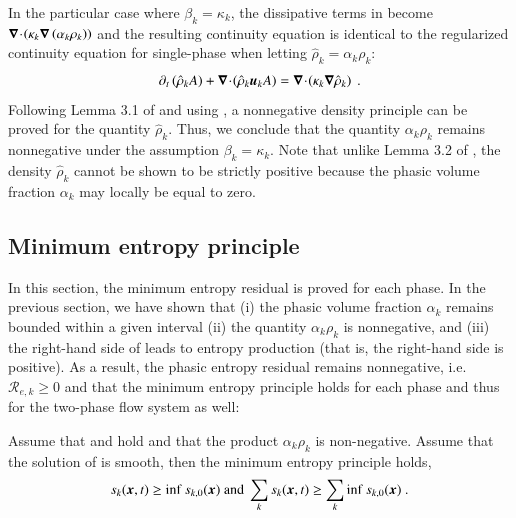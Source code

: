 %
In the particular case where $\beta_k = \kappa_k$, the dissipative terms in  become $\boldsymbol\nabla\! \cdot \! \left( \kappa_k \boldsymbol\nabla \left( \alpha_k \rho_k \right) \right)$ 
and the resulting continuity equation is identical to the regularized continuity equation for single-phase when letting $\hat{\rho}_k = \alpha_k \rho_k$:
%
\begin{equation}\label{eq:reg-euler-qu}
\partial_t \left( \hat{\rho}_k A \right) + \div \left( \hat{\rho}_k \mbold u_k A \right) = \div \left( \kappa_k \grad \hat{\rho}_k \right) \ .
\end{equation}
%
Following Lemma 3.1 of \cite{jlg_VR_SIAM_2004} and using , a nonnegative density principle can be proved for the quantity 
$\hat{\rho}_k$. Thus, we conclude that the quantity $\alpha_k \rho_k$ remains nonnegative under the assumption $\beta_k = \kappa_k$. 
Note that unlike Lemma 3.2 of \cite{jlg_VR_SIAM_2004}, the density 
$\hat{\rho}_k$ cannot be shown to be strictly positive because the phasic volume fraction $\alpha_k$ may locally be equal to zero.
%
%
\subsection{Minimum entropy principle}\label{sct:end-min-pr}
%
In this section, the minimum entropy residual is proved for each phase. 
In the previous section, we have shown  that 
(i) the phasic volume fraction $\alpha_k$ remains bounded within a given interval 
(ii)  the quantity $\alpha_k \rho_k$ is nonnegative, 
and (iii) the right-hand side of  leads to entropy production (that is, the right-hand side is positive). 
As a result, the phasic entropy residual remains nonnegative, i.e. $\mathcal{R}_{e,k} \geq 0$
and that the minimum entropy principle holds for each phase and thus for the two-phase flow system as well:
%
\begin{theorem}
Assume that  and  hold and that the product $\alpha_k \rho_k$ is non-negative. Assume that the solution
of  is smooth, then the minimum entropy principle holds,
%
\begin{align}
s_k(\boldsymbol x, t) \geq \text{inf } s_{k,0}(\boldsymbol x) \text{ and } \sum_k s_k(\boldsymbol x, t) \geq \sum_k \text{inf } s_{k,0}(\boldsymbol x) \ . \nonumber
\end{align}
%
\end{theorem}

